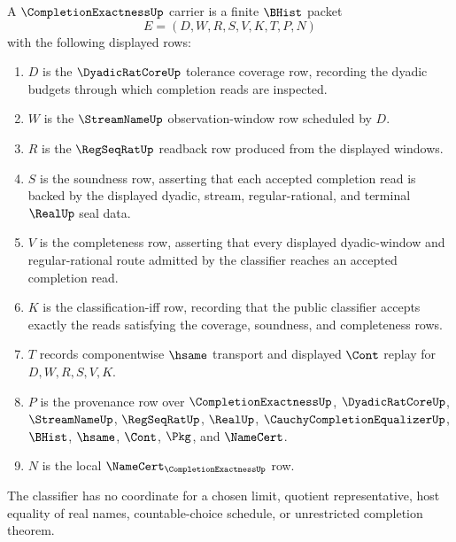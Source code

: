 \begin{definition}
\label{def:completion-exactness-carrier}
A $\CompletionExactnessUp$ carrier is a finite $\BHist$ packet
$$
E=(D,W,R,S,V,K,T,P,N)
$$
with the following displayed rows:
\begin{enumerate}
\item $D$ is the $\DyadicRatCoreUp$ tolerance coverage row, recording the dyadic budgets through which completion reads are inspected.
\item $W$ is the $\StreamNameUp$ observation-window row scheduled by $D$.
\item $R$ is the $\RegSeqRatUp$ readback row produced from the displayed windows.
\item $S$ is the soundness row, asserting that each accepted completion read is backed by the displayed dyadic, stream, regular-rational, and terminal $\RealUp$ seal data.
\item $V$ is the completeness row, asserting that every displayed dyadic-window and regular-rational route admitted by the classifier reaches an accepted completion read.
\item $K$ is the classification-iff row, recording that the public classifier accepts exactly the reads satisfying the coverage, soundness, and completeness rows.
\item $T$ records componentwise $\hsame$ transport and displayed $\Cont$ replay for $D,W,R,S,V,K$.
\item $P$ is the provenance row over $\CompletionExactnessUp$, $\DyadicRatCoreUp$, $\StreamNameUp$, $\RegSeqRatUp$, $\RealUp$, $\CauchyCompletionEqualizerUp$, $\BHist$, $\hsame$, $\Cont$, $\Pkg$, and $\NameCert$.
\item $N$ is the local $\NameCert_{\CompletionExactnessUp}$ row.
\end{enumerate}
The classifier has no coordinate for a chosen limit, quotient representative, host equality of real names, countable-choice schedule, or unrestricted completion theorem.
\end{definition}

